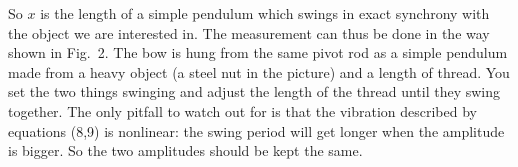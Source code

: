  So $x$ is the length of a simple pendulum which swings in exact synchrony 
  with the object we are interested in. The measurement can thus be done in the 
  way shown in Fig.\ 2. The bow is hung from the same pivot rod as a simple 
  pendulum made from a heavy object (a steel nut in the picture) and a length 
  of thread. You set the two things swinging and adjust the length of the 
  thread until they swing together. The only pitfall to watch out for is that 
  the vibration described by equations (8,9) is nonlinear: the swing period 
  will get longer when the amplitude is bigger. So the two amplitudes should be 
  kept the same. 

